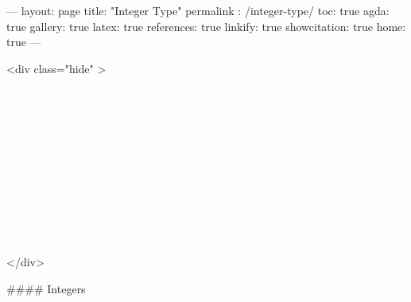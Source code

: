 ---
layout: page
title: "Integer Type"
permalink : /integer-type/
toc: true
agda: true
gallery: true
latex: true
references: true
linkify: true
showcitation: true
home: true
---

<div class="hide" >
\begin{code}%
\>[0]\AgdaSymbol{\{-\#}\AgdaSpace{}%
\AgdaSpace{}%
\AgdaSpace{}%
\AgdaSymbol{\#-\}}\<%
\\
\>[0]\AgdaSpace{}%
\AgdaSpace{}%
\<%
\\
\>[0]\AgdaSpace{}%
\AgdaSpace{}%
\<%
\\
%
\\[\AgdaEmptyExtraSkip]%
\>[0]\AgdaSpace{}%
\AgdaSpace{}%
\<%
\\
\>[0]\AgdaSpace{}%
\AgdaSpace{}%
\<%
\\
\>[0]\AgdaSpace{}%
\AgdaSpace{}%
\<%
\\
\>[0]\AgdaSpace{}%
\AgdaSpace{}%
\<%
\\
\>[0]\AgdaSpace{}%
\AgdaSpace{}%
\<%
\\
\>[0]\AgdaSpace{}%
\AgdaSpace{}%
\<%
\\
\>[0]\AgdaSpace{}%
\AgdaSpace{}%
\<%
\end{code}
</div>


#### Integers

